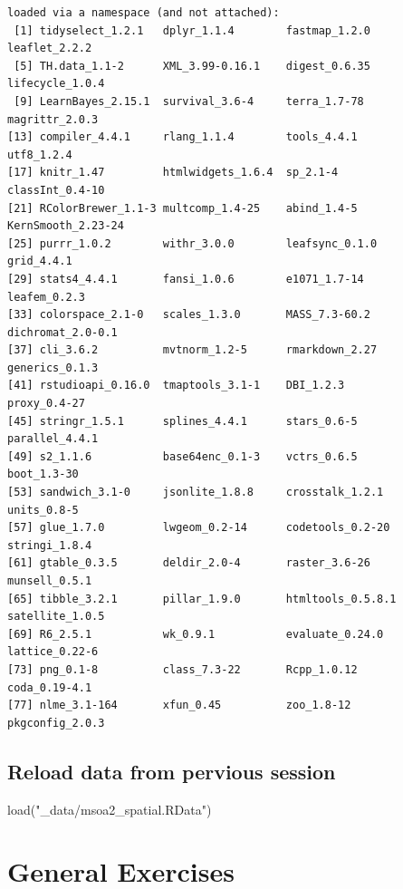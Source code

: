 \documentclass[
  letterpaper,
  DIV=11,
  numbers=noendperiod]{scrreprt}
\newenvironment{Shaded}{\begin{snugshade}}{\end{snugshade}}
\newcommand{\FunctionTok}[1]{\textcolor[rgb]{0.28,0.35,0.67}{#1}}
\newcommand{\NormalTok}[1]{\textcolor[rgb]{0.00,0.23,0.31}{#1}}
\newcommand{\StringTok}[1]{\textcolor[rgb]{0.13,0.47,0.30}{#1}}
\begin{document}
\begin{verbatim}
loaded via a namespace (and not attached):
 [1] tidyselect_1.2.1   dplyr_1.1.4        fastmap_1.2.0      leaflet_2.2.2     
 [5] TH.data_1.1-2      XML_3.99-0.16.1    digest_0.6.35      lifecycle_1.0.4   
 [9] LearnBayes_2.15.1  survival_3.6-4     terra_1.7-78       magrittr_2.0.3    
[13] compiler_4.4.1     rlang_1.1.4        tools_4.4.1        utf8_1.2.4        
[17] knitr_1.47         htmlwidgets_1.6.4  sp_2.1-4           classInt_0.4-10   
[21] RColorBrewer_1.1-3 multcomp_1.4-25    abind_1.4-5        KernSmooth_2.23-24
[25] purrr_1.0.2        withr_3.0.0        leafsync_0.1.0     grid_4.4.1        
[29] stats4_4.4.1       fansi_1.0.6        e1071_1.7-14       leafem_0.2.3      
[33] colorspace_2.1-0   scales_1.3.0       MASS_7.3-60.2      dichromat_2.0-0.1 
[37] cli_3.6.2          mvtnorm_1.2-5      rmarkdown_2.27     generics_0.1.3    
[41] rstudioapi_0.16.0  tmaptools_3.1-1    DBI_1.2.3          proxy_0.4-27      
[45] stringr_1.5.1      splines_4.4.1      stars_0.6-5        parallel_4.4.1    
[49] s2_1.1.6           base64enc_0.1-3    vctrs_0.6.5        boot_1.3-30       
[53] sandwich_3.1-0     jsonlite_1.8.8     crosstalk_1.2.1    units_0.8-5       
[57] glue_1.7.0         lwgeom_0.2-14      codetools_0.2-20   stringi_1.8.4     
[61] gtable_0.3.5       deldir_2.0-4       raster_3.6-26      munsell_0.5.1     
[65] tibble_3.2.1       pillar_1.9.0       htmltools_0.5.8.1  satellite_1.0.5   
[69] R6_2.5.1           wk_0.9.1           evaluate_0.24.0    lattice_0.22-6    
[73] png_0.1-8          class_7.3-22       Rcpp_1.0.12        coda_0.19-4.1     
[77] nlme_3.1-164       xfun_0.45          zoo_1.8-12         pkgconfig_2.0.3   
\end{verbatim}

\hypertarget{reload-data-from-pervious-session-2}{%
\subsection*{Reload data from pervious
session}\label{reload-data-from-pervious-session-2}}

\begin{Shaded}
\begin{Highlighting}[]
\FunctionTok{load}\NormalTok{(}\StringTok{"\_data/msoa2\_spatial.RData"}\NormalTok{)}
\end{Highlighting}
\end{Shaded}

\hypertarget{general-exercises}{%
\section{General Exercises}\label{general-exercises}}
\end{document}
